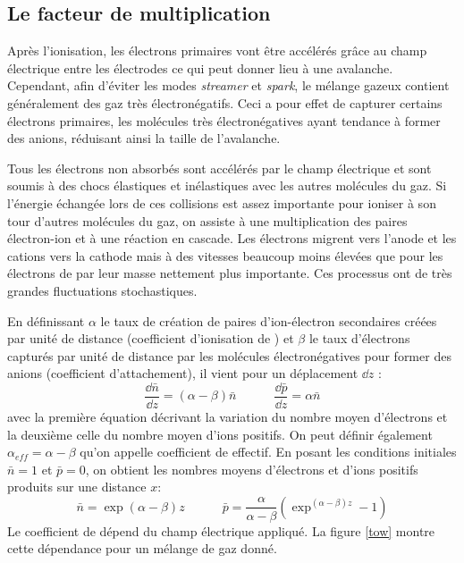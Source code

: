 \subsection{Le facteur de multiplication}
Après l'ionisation, les électrons primaires vont être accélérés grâce au champ électrique entre les électrodes ce qui peut donner lieu à une avalanche. Cependant, afin d'éviter les modes \textit{streamer} et \textit{spark}, le mélange gazeux contient généralement des gaz très électronégatifs. Ceci a pour effet de capturer certains électrons primaires, les molécules très électronégatives ayant tendance à former des anions, réduisant ainsi la taille de l'avalanche. 

Tous les électrons non absorbés sont accélérés par le champ électrique et sont soumis à des chocs élastiques et inélastiques avec les autres molécules du gaz. Si l'énergie échangée lors de ces collisions est assez importante pour ioniser à son tour d'autres molécules du gaz, on assiste à une multiplication des paires électron-ion et à une réaction en cascade. Les électrons migrent vers l'anode et les cations vers la cathode mais à des vitesses beaucoup moins élevées que pour les électrons de par leur masse nettement plus importante. Ces processus ont de très grandes fluctuations stochastiques.

En définissant $\alpha$ le taux de création de paires d'ion-électron secondaires créées par unité de distance (coefficient d'ionisation de ) et  $\beta$ le taux d'électrons capturés par unité de distance par les molécules électronégatives pour former des anions (coefficient d'attachement), il vient pour un déplacement  $\dd z$ :
\begin{equation}
	\frac{\dd \bar{n}}{\dd z}=(\alpha-\beta)\bar{n} \quad \quad \quad \frac{\dd \bar{p}}{\dd z}=\alpha\bar{n} 
\end{equation}
avec la première équation décrivant la variation du nombre moyen d'électrons et la deuxième celle du nombre moyen d'ions positifs. On peut définir également $\alpha_{eff}=\alpha-\beta$ qu'on appelle coefficient de  effectif. En posant les conditions initiales $\bar{n}=1$ et $\bar{p}=0$, on obtient les nombres moyens d'électrons et d'ions positifs produits sur une distance $x$: 
\begin{equation}
\bar{n}=\exp(\alpha-\beta)z \quad \quad \quad \bar{p}=\frac{\alpha}{\alpha-\beta}\left(\exp^{(\alpha-\beta)z}-1\right)
\end{equation}
Le coefficient de  dépend du champ électrique appliqué. La figure \ref{tow} montre cette dépendance pour un mélange de gaz donné.

